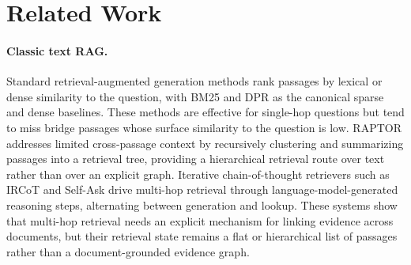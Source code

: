 %
%

\section{Related Work}
\label{sec:related}

\paragraph{Classic text RAG.}
Standard retrieval-augmented generation methods rank passages by
lexical or dense similarity to the question, with BM25
\citep{robertson2009bm25} and DPR \citep{karpukhin2020dpr} as the
canonical sparse and dense baselines. These methods are effective
for single-hop questions but tend to miss bridge passages whose
surface similarity to the question is low. RAPTOR
\citep{sarthi2024raptor} addresses limited cross-passage context by
recursively clustering and summarizing passages into a retrieval
tree, providing a hierarchical retrieval route over text rather
than over an explicit graph. Iterative chain-of-thought retrievers
such as IRCoT \citep{trivedi2023ircot} and Self-Ask
\citep{press2023selfask} drive multi-hop retrieval through
language-model-generated reasoning steps, alternating between
generation and lookup. These systems show that multi-hop retrieval
needs an explicit mechanism for linking evidence across documents,
but their retrieval state remains a flat or hierarchical list of
passages rather than a document-grounded evidence graph.

